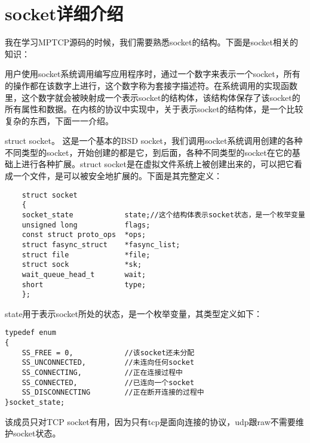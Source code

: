 \section{socket详细介绍}
我在学习MPTCP源码的时候，我们需要熟悉socket的结构。下面是socket相关的知识：

用户使用socket系统调用编写应用程序时，通过一个数字来表示一个socket，所有的操作都在该数字上进行，这个数字称为套接字描述符。在系统调用的实现函数里，这个数字就会被映射成一个表示socket的结构体，该结构体保存了该socket的所有属性和数据。在内核的协议中实现中，关于表示socket的结构体，是一个比较复杂的东西，下面一一介绍。

struct socket。
这是一个基本的BSD socket，我们调用socket系统调用创建的各种不同类型的socket，开始创建的都是它，到后面，各种不同类型的socket在它的基础上进行各种扩展。struct socket是在虚拟文件系统上被创建出来的，可以把它看成一个文件，是可以被安全地扩展的。下面是其完整定义：
\begin{verbatim}
    struct socket 
    {
    socket_state            state;//这个结构体表示socket状态，是一个枚举变量
    unsigned long           flags;
    const struct proto_ops  *ops;
    struct fasync_struct    *fasync_list;
    struct file             *file;
    struct sock             *sk;
    wait_queue_head_t       wait;
    short                   type;
    };
\end{verbatim}

state用于表示socket所处的状态，是一个枚举变量，其类型定义如下：
\begin{verbatim}
typedef enum
{
	SS_FREE = 0,            //该socket还未分配
	SS_UNCONNECTED,         //未连向任何socket
	SS_CONNECTING,          //正在连接过程中
	SS_CONNECTED,           //已连向一个socket
	SS_DISCONNECTING        //正在断开连接的过程中
}socket_state;
\end{verbatim}
该成员只对TCP socket有用，因为只有tcp是面向连接的协议，udp跟raw不需要维护socket状态。

